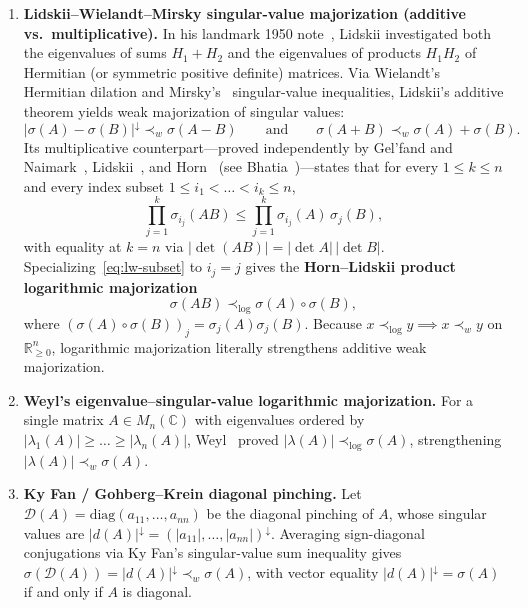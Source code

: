 \documentclass[11pt,a4paper]{article}
\theoremstyle{definition}
\newcommand{\R}{\mathbb{R}}
\newcommand{\C}{\mathbb{C}}
\newcommand{\diag}{\mathrm{diag}}
\begin{document}
\begin{enumerate}
  \item \textbf{Lidskii--Wielandt--Mirsky singular-value majorization (additive vs.\ multiplicative).}
  In his landmark 1950 note~\cite{Lidskii1950}, Lidskii investigated both the eigenvalues of sums $H_1 + H_2$ and the eigenvalues of products $H_1 H_2$ of Hermitian (or symmetric positive definite) matrices. Via Wielandt's~\cite{Wielandt1955} Hermitian dilation and Mirsky's~\cite{Mirsky1960} singular-value inequalities, Lidskii's additive theorem yields weak majorization of singular values:
  \[
    |\sigma(A) - \sigma(B)|^\downarrow \prec_w \sigma(A - B)
    \qquad\text{and}\qquad
    \sigma(A + B) \prec_w \sigma(A) + \sigma(B).
  \]
  Its multiplicative counterpart---proved independently by Gel'fand and Naimark~\cite{GelfandNaimark1950}, Lidskii~\cite{Lidskii1950}, and Horn~\cite{Horn1950} (see Bhatia~\cite[Theorem~III.4.5 and Corollary~III.4.6]{Bhatia1997})---states that for every $1 \le k \le n$ and every index subset $1 \le i_1 < \dots < i_k \le n$,
  \begin{equation}\label{eq:lw-subset}
    \prod_{j=1}^k \sigma_{i_j}(AB) \le \prod_{j=1}^k \sigma_{i_j}(A)\,\sigma_j(B),
  \end{equation}
  with equality at $k = n$ via $|\det(AB)| = |\det A|\,|\det B|$. Specializing~\eqref{eq:lw-subset} to $i_j = j$ gives the \textbf{Horn--Lidskii product logarithmic majorization}
  \begin{equation}\label{eq:horn-logmaj}
    \sigma(AB) \prec_{\log} \sigma(A) \circ \sigma(B),
  \end{equation}
  where $(\sigma(A)\circ\sigma(B))_j = \sigma_j(A)\sigma_j(B)$. Because $x \prec_{\log} y \implies x \prec_w y$ on $\R_{\ge 0}^n$, logarithmic majorization literally strengthens additive weak majorization.

  \item \textbf{Weyl's eigenvalue--singular-value logarithmic majorization.}
  For a single matrix $A \in M_n(\C)$ with eigenvalues ordered by $|\lambda_1(A)| \ge \dots \ge |\lambda_n(A)|$, Weyl~\cite{Weyl1949} proved $|\lambda(A)| \prec_{\log} \sigma(A)$, strengthening $|\lambda(A)| \prec_w \sigma(A)$.

  \item \textbf{Ky Fan / Gohberg--Krein diagonal pinching.}
  Let $\mathcal{D}(A) = \diag(a_{11}, \dots, a_{nn})$ be the diagonal pinching of $A$, whose singular values are $|d(A)|^\downarrow = (|a_{11}|, \dots, |a_{nn}|)^\downarrow$. Averaging sign-diagonal conjugations via Ky Fan's singular-value sum inequality gives $\sigma(\mathcal{D}(A)) = |d(A)|^\downarrow \prec_w \sigma(A)$, with vector equality $|d(A)|^\downarrow = \sigma(A)$ if and only if $A$ is diagonal.
\end{enumerate}
\end{document}
